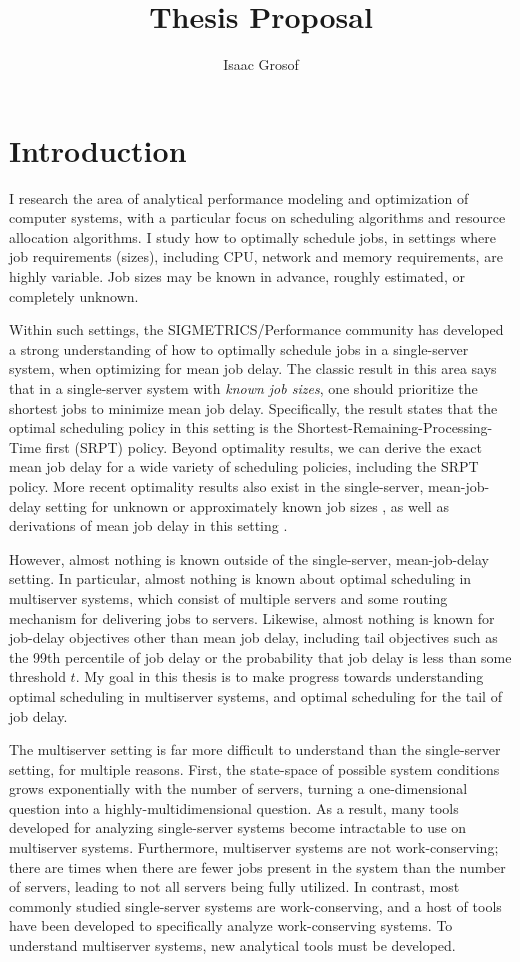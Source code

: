 \documentclass[11pt]{article}
\title{Thesis Proposal}
\author{Isaac Grosof}
\date{}
\begin{document}
\maketitle
\section{Introduction}
I research the area of analytical performance modeling and optimization of computer systems,
with a particular focus on scheduling algorithms and resource allocation algorithms.
I study how to optimally schedule jobs,
in settings where job requirements (sizes),
including CPU, network and memory requirements,
are highly variable.
Job sizes may be known in advance,
roughly estimated,
or completely unknown.

Within such settings,
the SIGMETRICS/Performance community has developed a strong understanding
of how to optimally schedule jobs in a single-server system,
when optimizing for mean job delay.
The classic result in this area \cite{doi:10.1287/opre.16.3.687}
says that in a single-server system with \textit{known job sizes},
one should prioritize the shortest jobs to minimize mean job delay.
Specifically, the result states that the optimal scheduling policy in this setting
is the Shortest-Remaining-Processing-Time first (SRPT) policy.
Beyond optimality results,
we can derive the exact mean job delay for a wide variety of scheduling policies,
including the SRPT policy.
More recent optimality results also exist in the single-server, mean-job-delay setting
for unknown or approximately known job sizes \cite{doi:10.1111/j.2517-6161.1979.tb01068.x},
as well as derivations of mean job delay in this setting \cite{Scully:2018:SOC:3203302.3179419}.

However, almost nothing is known outside of the single-server, mean-job-delay setting.
In particular, almost nothing is known about optimal scheduling in multiserver systems,
which consist of multiple servers and some routing mechanism for delivering jobs to servers.
Likewise, almost nothing is known for job-delay objectives other than mean job delay,
including tail objectives such as the 99th percentile of job delay
or the probability that job delay is less than some threshold $t$.
My goal in this thesis is to make progress towards understanding optimal scheduling
in multiserver systems,
and optimal scheduling for the tail of job delay.

The multiserver setting is far more difficult to understand than the single-server setting,
for multiple reasons.
First, the state-space of possible system conditions grows exponentially
with the number of servers,
turning a one-dimensional question into a highly-multidimensional question.
As a result, many tools developed for analyzing single-server systems
become intractable to use on multiserver systems.
Furthermore, multiserver systems are not work-conserving;
there are times when there are fewer jobs present in the system than the number of servers,
leading to not all servers being fully utilized.
In contrast, most commonly studied single-server systems are work-conserving,
and a host of tools have been developed to specifically analyze work-conserving systems.
To understand multiserver systems, new analytical tools must be developed.
\end{document}
